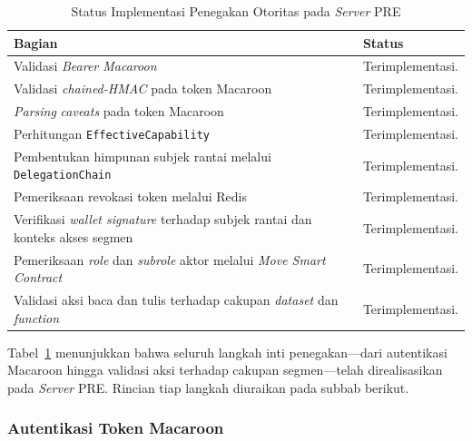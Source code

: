 \begin{table}[H]
	\centering
	\caption{Status Implementasi Penegakan Otoritas pada \textit{Server} PRE}
	\label{tab:status-implementasi-penegakan-otoritas-pre}
	\small
	\begin{tabular}{|p{}|p{}|}
		\hline
		\textbf{Bagian}                                                                           & \textbf{Status}  \\ \hline
		Validasi \textit{Bearer Macaroon}                                                         & Terimplementasi. \\ \hline
		Validasi \textit{chained-HMAC} pada token Macaroon                                        & Terimplementasi. \\ \hline
		\textit{Parsing} \textit{caveats} pada token Macaroon                                     & Terimplementasi. \\ \hline
		Perhitungan \texttt{EffectiveCapability}                                                  & Terimplementasi. \\ \hline
		Pembentukan himpunan subjek rantai melalui \texttt{DelegationChain}                       & Terimplementasi. \\ \hline
		Pemeriksaan revokasi token melalui Redis                                                  & Terimplementasi. \\ \hline
		Verifikasi \textit{wallet signature} terhadap subjek rantai dan konteks akses segmen      & Terimplementasi. \\ \hline
		Pemeriksaan \textit{role} dan \textit{subrole} aktor melalui \textit{Move Smart Contract} & Terimplementasi. \\ \hline
		Validasi aksi baca dan tulis terhadap cakupan \textit{dataset} dan \textit{function}      & Terimplementasi. \\ \hline
	\end{tabular}
\end{table}

Tabel~\ref{tab:status-implementasi-penegakan-otoritas-pre} menunjukkan bahwa seluruh langkah inti penegakan---dari autentikasi Macaroon hingga validasi aksi terhadap cakupan segmen---telah direalisasikan pada \textit{Server} PRE. Rincian tiap langkah diuraikan pada subbab berikut.

\subsubsection{Autentikasi Token Macaroon}
\label{subsec:autentikasi-token-macaroon}

